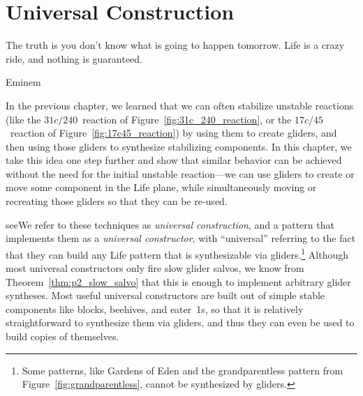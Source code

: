 
\renewcommand{\chapterfolder}{universal_construction/}
\chapter{Universal Construction}\label{chp:universal_construction}


\vspace*{-0.4in}
\epigraph{The truth is you don't know what is going to happen tomorrow. Life is a crazy ride, and nothing is guaranteed.}{Eminem}
\vspace*{0.4in}



\noindent In the previous chapter, we learned that we can often stabilize unstable reactions (like the $31c/240$~reaction of Figure~\ref{fig:31c_240_reaction}, or the $17c/45$~reaction of Figure~\ref{fig:17c45_reaction}) by using them to create gliders, and then using those gliders to synthesize stabilizing components. In this chapter, we take this idea one step further and show that similar behavior can be achieved without the need for the initial unstable reaction---we can use gliders to create or move some component in the Life plane, while simultaneously moving or recreating those gliders so that they can be re-used.

seeWe refer to these techniques as \emph{universal construction}, and a pattern that implements them as a \emph{universal constructor}, with ``universal'' referring to the fact that they can build any Life pattern that is synthesizable via gliders.\footnote{Some patterns, like Gardens of Eden and the grandparentless pattern from Figure~\ref{fig:grandparentless}, cannot be synthesized by gliders.} Although most universal constructors only fire slow glider salvos, we know from Theorem~\ref{thm:p2_slow_salvo} that this is enough to implement arbitrary glider syntheses. Most useful universal constructors are built out of simple stable components like blocks, beehives, and eater~1s, so that it is relatively straightforward to synthesize them via gliders, and thus they can even be used to build copies of themselves.

